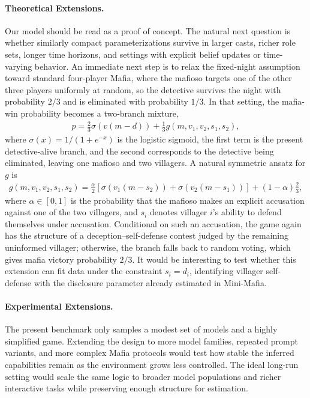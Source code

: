 \documentclass[sigconf,anonymous,balance=false]{aamas}
\begin{document}
\paragraph{Theoretical Extensions.} Our model should be read as a proof of concept. The natural next question is whether similarly compact parameterizations survive in larger casts, richer role sets, longer time horizons, and settings with explicit belief updates or time-varying behavior. An immediate next step is to relax the fixed-night assumption toward standard four-player Mafia, where the mafioso targets one of the other three players uniformly at random, so the detective survives the night with probability $2/3$ and is eliminated with probability $1/3$. In that setting, the mafia-win probability becomes a two-branch mixture,
\begin{align}
    p = \frac{2}{3}\sigma\!\left(v(m-d)\right) + \frac{1}{3}g(m,v_1,v_2,s_1,s_2),
\end{align}
where $\sigma(x)=1/(1+e^{-x})$ is the logistic sigmoid, the first term is the present detective-alive branch, and the second corresponds to the detective being eliminated, leaving one mafioso and two villagers. A natural symmetric ansatz for $g$ is
\begin{align}
    g(m,v_1,v_2,s_1,s_2) =
    \frac{\alpha}{2}
    \left[
        \sigma\!\left(v_1(m-s_2)\right)
        +
        \sigma\!\left(v_2(m-s_1)\right)
    \right]
    +(1-\alpha)\frac{2}{3},
\end{align}
where $\alpha\in[0,1]$ is the probability that the mafioso makes an explicit accusation against one of the two villagers, and $s_i$ denotes villager $i$'s ability to defend themselves under accusation. Conditional on such an accusation, the game again has the structure of a deception--self-defense contest judged by the remaining uninformed villager; otherwise, the branch falls back to random voting, which gives mafia victory probability $2/3$. It would be interesting to test whether this extension can fit data under the constraint $s_i=d_i$, identifying villager self-defense with the disclosure parameter already estimated in Mini-Mafia.

\paragraph{Experimental Extensions.} The present benchmark only samples a modest set of models and a highly simplified game. Extending the design to more model families, repeated prompt variants, and more complex Mafia protocols would test how stable the inferred capabilities remain as the environment grows less controlled. The ideal long-run setting would scale the same logic to broader model populations and richer interactive tasks while preserving enough structure for estimation.
\end{document}
